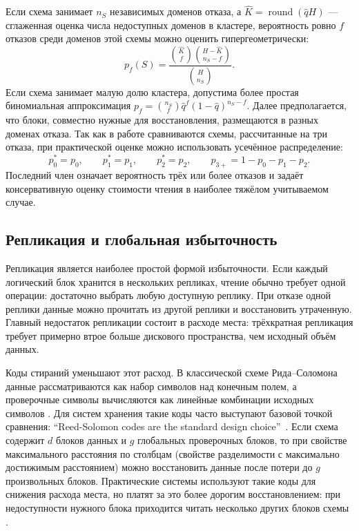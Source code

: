 Если схема занимает \(n_S\) независимых доменов отказа, а
\(\hat K=\operatorname{round}(\hat q H)\) --- сглаженная оценка числа
недоступных доменов в кластере, вероятность ровно \(f\) отказов среди доменов
этой схемы можно оценить гипергеометрически:
\[
    p_f(S)=
    \frac{
        \binom{\hat K}{f}\binom{H-\hat K}{n_S-f}
    }{
        \binom{H}{n_S}
    }.
\]
Если схема занимает малую долю кластера, допустима более простая биномиальная
аппроксимация \(p_f=\binom{n_S}{f}\hat q^f(1-\hat q)^{n_S-f}\). Далее
предполагается, что блоки, совместно нужные для восстановления, размещаются
в разных доменах отказа.
Так как в работе сравниваются схемы, рассчитанные на три отказа, при
практической оценке можно использовать усечённое распределение:
\[
    p_0^*=p_0,\qquad
    p_1^*=p_1,\qquad
    p_2^*=p_2,\qquad
    p_{3+}=1-p_0-p_1-p_2.
\]
Последний член означает вероятность трёх или более отказов и задаёт
консервативную оценку стоимости чтения в наиболее тяжёлом учитываемом случае.

\subsection{Репликация и глобальная избыточность}

Репликация является наиболее простой формой избыточности. Если каждый
логический блок хранится в нескольких репликах, чтение обычно требует одной
операции: достаточно выбрать любую доступную реплику. При отказе одной реплики
данные можно прочитать из другой реплики и восстановить утраченную. Главный
недостаток репликации состоит в расходе места: трёхкратная репликация требует
примерно втрое больше дискового пространства, чем исходный объём данных.

Коды стираний уменьшают этот расход. В классической схеме Рида--Соломона
данные рассматриваются как набор символов над конечным полем, а проверочные
символы вычисляются как линейные комбинации исходных символов
\cite{reed1960polynomial}. Для систем хранения такие коды часто выступают
базовой точкой сравнения: \enquote{Reed-Solomon codes are the standard design
choice}~\cite{sathiamoorthy2013xoring}. Если схема содержит \(d\) блоков данных и
\(g\) глобальных проверочных блоков, то при свойстве максимального расстояния
по столбцам (свойстве разделимости с максимально достижимым расстоянием) можно
восстановить данные после потери до \(g\) произвольных блоков. Практические
системы используют такие коды для снижения расхода места, но платят за это
более дорогим восстановлением: при недоступности нужного блока приходится
читать несколько других блоков схемы
\cite{huang2012azure,shen2024erasurecoding}.

